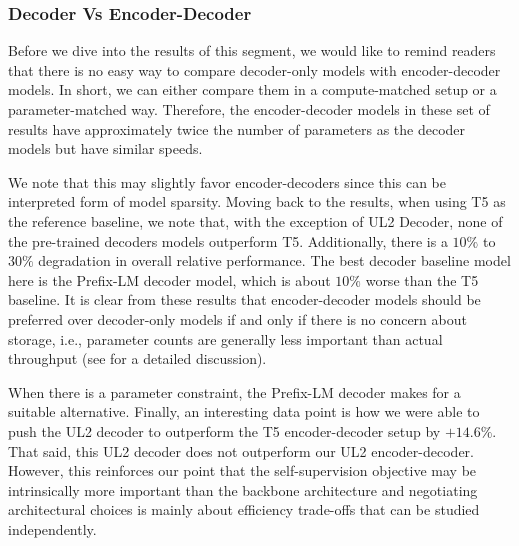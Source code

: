 \documentclass[10pt]{article}
\begin{document}
\subsubsection{Decoder Vs Encoder-Decoder}
Before we dive into the results of this segment, we would like to remind readers that there is no easy way to compare decoder-only models with encoder-decoder models. In short, we can either compare them in a compute-matched setup or a parameter-matched way. Therefore, the encoder-decoder models in these set of results have approximately twice the number of parameters as the decoder models but have similar speeds. 

We note that this may slightly favor encoder-decoders since this can be interpreted form of model sparsity. Moving back to the results, when using T5 as the reference baseline, we note that, with the exception of UL2 Decoder, none of the pre-trained decoders models outperform T5. Additionally, there is a $10\%$ to $30\%$ degradation in overall relative performance. The best decoder baseline model here is the Prefix-LM decoder model, which is about $10\%$ worse than the T5 baseline. It is clear from these results that encoder-decoder models should be preferred over decoder-only models if and only if there is no concern about storage, i.e., parameter counts are generally less important than actual throughput (see \citep{dehghani2021efficiency} for a detailed discussion). 

When there is a parameter constraint, the Prefix-LM decoder makes for a suitable alternative. Finally, an interesting data point is how we were able to push the UL2 decoder to outperform the T5 encoder-decoder setup by $+14.6\%$. That said, this UL2 decoder does not outperform our UL2 encoder-decoder. However, this reinforces our point that the self-supervision objective may be intrinsically more important than the backbone architecture and negotiating architectural choices is mainly about efficiency trade-offs that can be studied independently.
\end{document}
